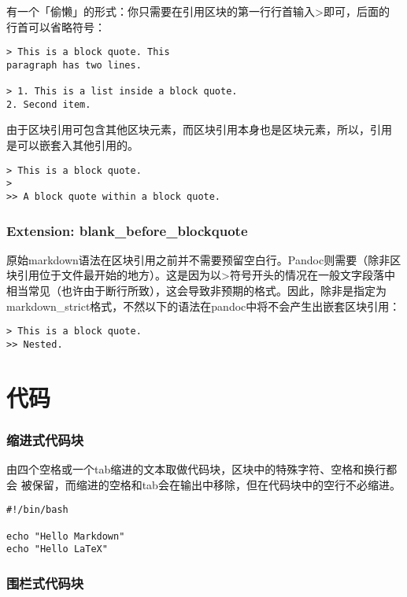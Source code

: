 \documentclass[fancyhdr,bookmark]{ctexbook}
\begin{document}
有一个「偷懒」的形式：你只需要在引用区块的第一行行首输入\textgreater{}即可，后面的
行首可以省略符号：

\begin{lstlisting}
> This is a block quote. This
paragraph has two lines.

> 1. This is a list inside a block quote.
2. Second item.
\end{lstlisting}

由于区块引用可包含其他区块元素，而区块引用本身也是区块元素，所以，引用
是可以嵌套入其他引用的。

\begin{lstlisting}
> This is a block quote.
>
>> A block quote within a block quote.
\end{lstlisting}

\subsubsection{Extension:
blank\_before\_blockquote}\label{extension-blankux5fbeforeux5fblockquote}

原始markdown语法在区块引用之前并不需要预留空白行。Pandoc则需要（除非区
块引用位于文件最开始的地方）。这是因为以\textgreater{}符号开头的情况在一般文字段落中
相当常见（也许由于断行所致），这会导致非预期的格式。因此，除非是指定为
markdown\_strict格式，不然以下的语法在pandoc中将不会产生出嵌套区块引用：

\begin{lstlisting}
> This is a block quote.
>> Nested.
\end{lstlisting}

\section{代码}\label{ux4ee3ux7801}

\subsubsection{缩进式代码块}\label{ux7f29ux8fdbux5f0fux4ee3ux7801ux5757}

由四个空格或一个tab缩进的文本取做代码块，区块中的特殊字符、空格和换行都会
被保留，而缩进的空格和tab会在输出中移除，但在代码块中的空行不必缩进。

\begin{lstlisting}
#!/bin/bash

echo "Hello Markdown"
echo "Hello LaTeX"
\end{lstlisting}

\subsubsection{围栏式代码块}\label{ux56f4ux680fux5f0fux4ee3ux7801ux5757}
\end{document}
